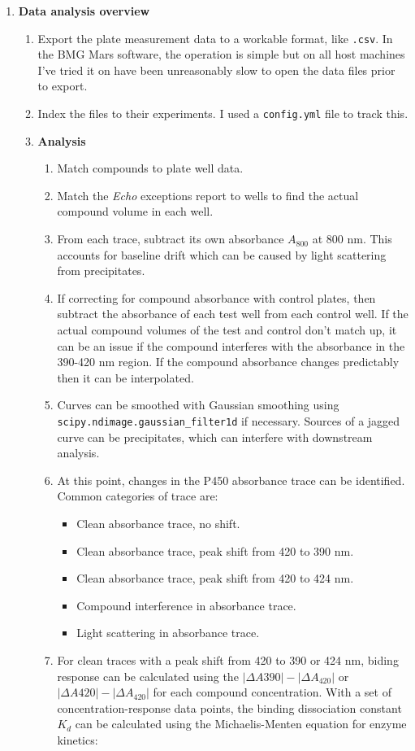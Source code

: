 \documentclass[16pt]{book}
\begin{document}
\begin{enumerate}
\item \textbf{Data analysis overview}
   \begin{enumerate}
	   \item Export the plate measurement data to a workable format, like \texttt{.csv}. 
	   In the BMG Mars software, the operation is simple but on all host machines I've tried it on have been unreasonably slow to open the data files prior to export.
   \item Index the files to their experiments. 
	   I used a \texttt{config.yml} file to track this.
   \item \textbf{Analysis}
		\begin{enumerate}
		\item Match compounds to plate well data.
		\item Match the \textit{Echo} exceptions report to wells to find the actual compound volume in each well.
		\item From each trace, subtract its own absorbance $A_{800}$ at 800 nm.
		   This accounts for baseline drift which can be caused by light scattering from precipitates.
		\item If correcting for compound absorbance with control plates, then subtract the absorbance of each test well from each control well.
		        If the actual compound volumes of the test and control don't match up, it can be an issue if the compound interferes with the absorbance in the 390-420 nm region.
		        If the compound absorbance changes predictably then it can be interpolated.
		\item Curves can be smoothed with Gaussian smoothing using \texttt{scipy.ndimage.gaussian\_filter1d} if necessary.
		        Sources of a jagged curve can be precipitates, which can interfere with downstream analysis.
		\item At this point, changes in the P450 absorbance trace can be identified.
		   Common categories of trace are:
			\begin{itemize}
			   \item Clean absorbance trace, no shift.
			   \item Clean absorbance trace, peak shift from 420 to 390 nm.
			   \item Clean absorbance trace, peak shift from 420 to 424 nm.
			   \item Compound interference in absorbance trace.
			   \item Light scattering in absorbance trace.
			\end{itemize}
		   \item For clean traces with a peak shift from 420 to 390 or 424 nm, biding response can be calculated using the $|\Delta A{390}| - |\Delta A_{420}|$ or $|\Delta A{420}| - |\Delta A_{420}|$  for each compound concentration.
		   With a set of concentration-response data points, the binding dissociation constant $K_d$ can be calculated using the Michaelis-Menten equation for enzyme kinetics:


\end{enumerate}
\end{enumerate}
\end{enumerate}
\end{document}
